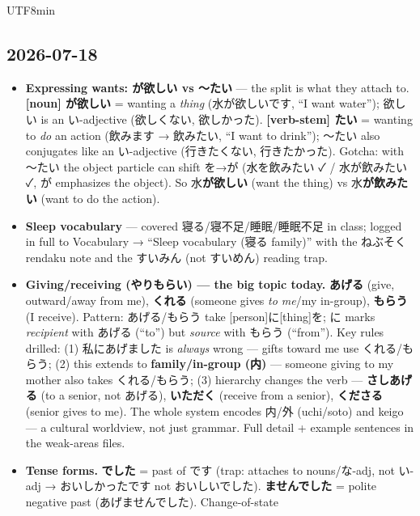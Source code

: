 \documentclass[11pt]{article}
\begin{document}
\begin{CJK}{UTF8}{min}
\subsection{2026-07-18}
\begin{itemize}
  \item \textbf{Expressing wants: \texorpdfstring{が欲しい}{ga hoshii} vs
        \texorpdfstring{〜たい}{-tai}} --- the split is what they attach to.
        \textbf{[noun] が欲しい} = wanting a \emph{thing} (水が欲しいです,
        ``I want water''); 欲しい is an い-adjective (欲しくない, 欲しかった).
        \textbf{[verb-stem] たい} = wanting to \emph{do} an action (飲みます →
        飲みたい, ``I want to drink''); 〜たい also conjugates like an
        い-adjective (行きたくない, 行きたかった). Gotcha: with 〜たい the object
        particle can shift を→が (水を飲みたい ✓ / 水が飲みたい ✓, が emphasizes
        the object). So 水\textbf{が欲しい} (want the thing) vs 水\textbf{が飲みたい}
        (want to do the action).
  \item \textbf{Sleep vocabulary} --- covered 寝る/寝不足/睡眠/睡眠不足 in class;
        logged in full to Vocabulary → ``Sleep vocabulary
        (\texorpdfstring{寝る}{neru} family)'' with the ねぶそく rendaku note and
        the すいみん (not すいめん) reading trap.
  \item \textbf{Giving/receiving (\texorpdfstring{やりもらい}{yarimorai}) ---
        the big topic today.} \textbf{あげる} (give, outward/away from me),
        \textbf{くれる} (someone gives \emph{to me}/my in-group),
        \textbf{もらう} (I receive). Pattern: あげる/もらう take
        [person]に[thing]を; に marks \emph{recipient} with あげる (``to'') but
        \emph{source} with もらう (``from''). Key rules drilled: (1) 私にあげました
        is \emph{always} wrong --- gifts toward me use くれる/もらう; (2) this
        extends to \textbf{family/in-group (内)} --- someone giving to my mother
        also takes くれる/もらう; (3) hierarchy changes the verb ---
        \textbf{さしあげる} (to a senior, not あげる), \textbf{いただく} (receive
        from a senior), \textbf{くださる} (senior gives to me). The whole system
        encodes 内/外 (uchi/soto) and keigo --- a cultural worldview, not just
        grammar. Full detail + example sentences in the weak-areas files.
  \item \textbf{Tense forms.} \textbf{でした} = past of です (trap: attaches to
        nouns/な-adj, not い-adj → おいしかったです not おいしいでした).
        \textbf{ませんでした} = polite negative past (あげませんでした). Change-of-state

\end{itemize}
\end{CJK}
\end{document}
